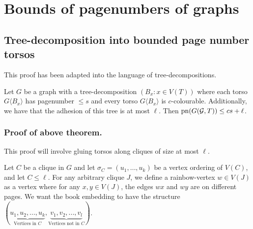 \section{Bounds of pagenumbers of graphs}\label{sec:BoundedPagenumber} 
\subsection{Tree-decomposition into bounded page number torsos}\label{ssec:Clique_sum_Pagenumber_bound}

This proof has been adapted into the language of tree-decompositions. 
\begin{theorem}\label{thm:clique_sum_pagenumber_bound}
	Let \(G\) be a graph with a tree-decomposition \((B_x: x \in V(T))\) where each torso \(G \langle B_x \rangle\) has pagenumber \(\leq s\) and every torso \(G \langle B_x \rangle\) is \(c\)-colourable. Additionally, we have that the adhesion of this tree is at most \(\ell\).
	Then \(\operatorname{pn}(G(\mathcal{G}, T)) \leq cs + \ell \).  
\end{theorem}

\subsubsection{Proof of above theorem.}
This proof will involve gluing torsos along cliques of size at most \( \ell \). 

Let \(C\) be a clique in \(G\) and let \(\sigma_C = (u_1, \ldots , u_k)\) be a vertex ordering of \(V(C)\), and let \(C \leq \ell \). For any arbitrary clique \(J\), we define a rainbow-vertex \(w \in V(J)\) as a vertex where for any \(x, y \in V(J)\), the edges \(wx\) and \(wy\) are on different pages. We want the book embedding to have the structure \((\underbrace{u_1, u_2, ..., u_k}_{\text{Vertices in } C}, \underbrace{v_1, v_2, ..., v_l}_{\text{Vertices not in }C})\). 

